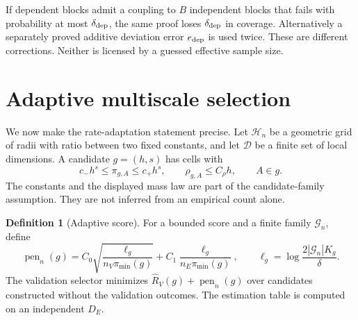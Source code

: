 \documentclass[11pt,a4paper]{article}
\numberwithin{equation}{section}
\theoremstyle{definition}\newtheorem{definition}[theorem]{Definition}
\theoremstyle{remark}\newtheorem{remark}[theorem]{Remark}
\begin{document}
If dependent blocks admit a coupling to $B$ independent blocks that fails with probability at most $\delta_{\rm dep}$, the same proof loses $\delta_{\rm dep}$ in coverage. Alternatively a separately proved additive deviation error $e_{\rm dep}$ is used twice. These are different corrections. Neither is licensed by a guessed effective sample size.

\section{Adaptive multiscale selection}\label{sec:adaptive}
We now make the rate-adaptation statement precise. Let $\mathcal H_n$ be a geometric grid of radii with ratio between two fixed constants, and let $\mathcal D$ be a finite set of local dimensions. A candidate $g=(h,s)$ has cells with
\[
 c_-h^s\le \pi_{g,A}\le c_+h^s,\qquad
 \rho_{g,A}\le C_\rho h,\qquad A\in g.
\]
The constants and the displayed mass law are part of the candidate-family assumption. They are not inferred from an empirical count alone.

\begin{definition}[Adaptive score]
For a bounded score and a finite family $\mathcal G_n$, define
\[
 \operatorname{pen}_n(g)=C_0\sqrt{\frac{\ell_g}{n_V\pi_{\min}(g)}}
       +C_1\frac{\ell_g}{n_E\pi_{\min}(g)},\qquad
 \ell_g=\log\frac{2|\mathcal G_n|K_g}{\delta}.
\]
The validation selector minimizes $\widehat R_V(g)+\operatorname{pen}_n(g)$ over candidates constructed without the validation outcomes. The estimation table is computed on an independent $D_E$.
\end{definition}
\end{document}
